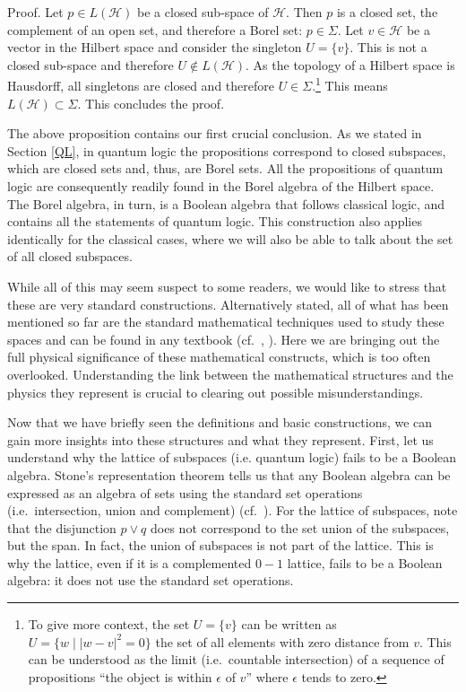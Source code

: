 \documentclass[11pt, executivepaper]{article}
\begin{document}
Proof. Let $p \in L(\mathcal{H})$ be a closed sub-space of $\mathcal{H}$. Then $p$ is a closed set, the complement of an open set, and therefore a Borel set: $p \in \Sigma$. Let $v \in \mathcal{H}$ be a vector in the Hilbert space and consider the singleton $U = \{ v \}$. This is not a closed sub-space and therefore $U \notin L(\mathcal{H})$. As the topology of a Hilbert space is Hausdorff, all singletons are closed and therefore $U \in \Sigma$.\footnote{To give more context, the set $U = \{ v \}$ can be written as $U = \{w \; | \; |w - v|^2 = 0\}$ the set of all elements with zero distance from $v$. This can be understood as the limit (i.e.\ countable intersection) of a sequence of propositions ``the object is within $\epsilon$ of $v$'' where $\epsilon$ tends to zero.} This means $L(\mathcal{H}) \subset \Sigma$. This concludes the proof.

The above proposition contains our first crucial conclusion. As we stated in Section \ref{QL}, in quantum logic the propositions correspond to closed subspaces, which are closed sets and, thus, are Borel sets. All the propositions of quantum logic are consequently readily found in the Borel algebra of the Hilbert space. The Borel algebra, in turn, is a Boolean algebra that follows classical logic, and contains all the statements of quantum logic. This construction also applies identically for the classical cases, where we will also be able to talk about the set of all closed subspaces.

While all of this may seem suspect to some readers, we would like to stress that these are very standard constructions. Alternatively stated, all of what has been mentioned so far are the standard mathematical techniques used to study these spaces and can be found in any textbook (cf.\ \cite{Rudin:1991}, \cite{Vasudeva:2017}). Here we are bringing out the full physical significance of these mathematical constructs, which is too often overlooked. Understanding the link between the mathematical structures and the physics they represent is crucial to clearing out possible misunderstandings.

Now that we have briefly seen the definitions and basic constructions, we can gain more insights into these structures and what they represent. First, let us understand why the lattice of subspaces (i.e. quantum logic) fails to be a Boolean algebra. Stone's representation theorem tells us that any Boolean algebra can be expressed as an algebra of sets using the standard set operations (i.e.\ intersection, union and complement) (cf.\ \cite{Davey:2002}). For the lattice of subspaces, note that the disjunction $p \vee q$ does not correspond to the set union of the subspaces, but the span. In fact, the union of subspaces is not part of the lattice.  This is why the lattice, even if it is a complemented $0-1$ lattice, fails to be a Boolean algebra: it does not use the standard set operations.
\end{document}
